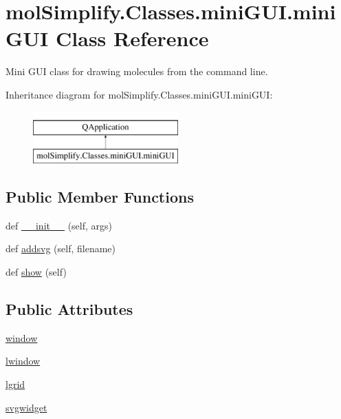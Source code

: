 \hypertarget{classmolSimplify_1_1Classes_1_1miniGUI_1_1miniGUI}{}\section{mol\+Simplify.\+Classes.\+mini\+G\+U\+I.\+mini\+G\+UI Class Reference}
\label{classmolSimplify_1_1Classes_1_1miniGUI_1_1miniGUI}


Mini G\+UI class for drawing molecules from the command line.  


Inheritance diagram for mol\+Simplify.\+Classes.\+mini\+G\+U\+I.\+mini\+G\+UI\+:\begin{figure}[H]
\begin{center}
\leavevmode
\includegraphics[height=2.000000cm]{classmolSimplify_1_1Classes_1_1miniGUI_1_1miniGUI}
\end{center}
\end{figure}
\subsection*{Public Member Functions}
\begin{DoxyCompactItemize}
\item 
def \hyperlink{classmolSimplify_1_1Classes_1_1miniGUI_1_1miniGUI_aad88ec5d3df2668211cbd2433356a848}{\+\_\+\+\_\+init\+\_\+\+\_\+} (self, args)
\item 
def \hyperlink{classmolSimplify_1_1Classes_1_1miniGUI_1_1miniGUI_a811c9618658a0ccf8ea05675a7548b95}{addsvg} (self, filename)
\item 
def \hyperlink{classmolSimplify_1_1Classes_1_1miniGUI_1_1miniGUI_a7b754f3a1031329ab7f45f6edf23a44f}{show} (self)
\end{DoxyCompactItemize}
\subsection*{Public Attributes}
\begin{DoxyCompactItemize}
\item 
\hyperlink{classmolSimplify_1_1Classes_1_1miniGUI_1_1miniGUI_ad87646506731f9daca029e19d7e77bc8}{window}
\item 
\hyperlink{classmolSimplify_1_1Classes_1_1miniGUI_1_1miniGUI_ab0e0287a99e55edfe42679806ffe4173}{lwindow}
\item 
\hyperlink{classmolSimplify_1_1Classes_1_1miniGUI_1_1miniGUI_a0af9c62718e1c849c23dc2256b1c70c3}{lgrid}
\item 
\hyperlink{classmolSimplify_1_1Classes_1_1miniGUI_1_1miniGUI_af9f9bd955f06b1cd712c4ec3083d7079}{svgwidget}
\end{DoxyCompactItemize}


